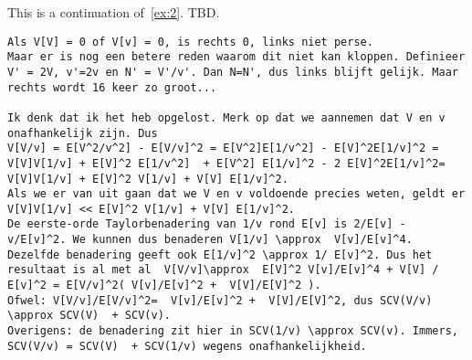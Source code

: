 \documentclass[assignments]{subfiles}
\begin{document}
\begin{exercise}\label{ex:3}
This is a continuation of~\cref{ex:2}.  TBD.

\begin{verbatim}
Als V[V] = 0 of V[v] = 0, is rechts 0, links niet perse.
Maar er is nog een betere reden waarom dit niet kan kloppen. Definieer V' = 2V, v'=2v en N' = V'/v'. Dan N=N', dus links blijft gelijk. Maar rechts wordt 16 keer zo groot...

Ik denk dat ik het heb opgelost. Merk op dat we aannemen dat V en v onafhankelijk zijn. Dus
V[V/v] = E[V^2/v^2] - E[V/v]^2 = E[V^2]E[1/v^2] - E[V]^2E[1/v]^2 = V[V]V[1/v] + E[V]^2 E[1/v^2]  + E[V^2] E[1/v]^2 - 2 E[V]^2E[1/v]^2= V[V]V[1/v] + E[V]^2 V[1/v] + V[V] E[1/v]^2.
Als we er van uit gaan dat we V en v voldoende precies weten, geldt er V[V]V[1/v] << E[V]^2 V[1/v] + V[V] E[1/v]^2.
De eerste-orde Taylorbenadering van 1/v rond E[v] is 2/E[v] - v/E[v]^2. We kunnen dus benaderen V[1/v] \approx  V[v]/E[v]^4.
Dezelfde benadering geeft ook E[1/v]^2 \approx 1/ E[v]^2. Dus het resultaat is al met al  V[V/v]\approx  E[V]^2 V[v]/E[v]^4 + V[V] / E[v]^2 = E[V/v]^2( V[v]/E[v]^2 +  V[V]/E[V]^2 ).
Ofwel: V[V/v]/E[V/v]^2=  V[v]/E[v]^2 +  V[V]/E[V]^2, dus SCV(V/v) \approx SCV(V)  + SCV(v).
Overigens: de benadering zit hier in SCV(1/v) \approx SCV(v). Immers, SCV(V/v) = SCV(V)  + SCV(1/v) wegens onafhankelijkheid.

\end{verbatim}


\end{exercise}
\end{document}
